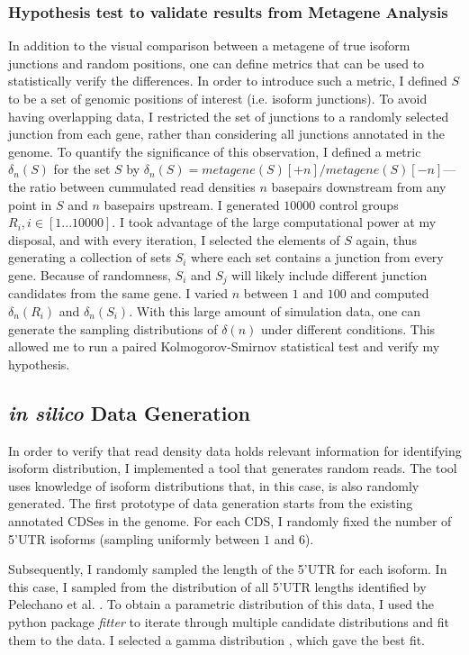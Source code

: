 \documentclass[12pt]{article}
\begin{document}
\subsubsection{Hypothesis test to validate results from Metagene Analysis} \label{ks_test}
In addition to the visual comparison between a metagene of true isoform junctions and random positions, one can define metrics that can be used to statistically verify the differences. In order to introduce such a metric, I defined $S$ to be a set of genomic positions of interest (i.e. isoform junctions). To avoid having overlapping data, I restricted the set of junctions to a randomly selected junction from each gene, rather than considering all junctions annotated in the genome.     
To quantify the significance of this observation, I defined a metric $\delta_n(S)$ for the set $S$ by $\delta_n(S) = metagene(S)[+n] / metagene(S)[-n]$---the ratio between cummulated read densities $n$ basepairs downstream from any point in $S$ and $n$ basepairs upstream. I generated $10000$ control groups $R_i, i \in [1...10000]$. I took advantage of the large computational power at my disposal, and with every iteration, I selected the elements of $S$ again, thus generating a collection of sets $S_i$ where each set contains a junction from every gene. Because of randomness, $S_i$ and $S_j$ will likely include different junction candidates from the same gene. I varied $n$ between $1$ and $100$ and computed $\delta_n(R_i)$ and $\delta_n(S_i)$. With this large amount of simulation data, one can generate the sampling distributions of $\delta(n)$ under different conditions. This allowed me to run a paired Kolmogorov-Smirnov \cite{Massey1951} statistical test and verify my hypothesis. 


\subsection{\textit{in silico} Data Generation}\label{generating}

In order to verify that read density data holds relevant information for identifying isoform distribution, I implemented a tool that generates random reads. The tool uses knowledge of isoform distributions that, in this case, is also randomly generated. The first prototype of data generation starts from the existing annotated CDSes in the genome. For each CDS, I randomly fixed the number of 5'UTR isoforms (sampling uniformly between $1$ and $6$). 

Subsequently, I randomly sampled the length of the 5'UTR for each isoform. In this case, I sampled from the distribution of all 5'UTR lengths identified by Pelechano et al. \cite{Pelechano2013}. To obtain a parametric distribution of this data, I used the python package \textit{fitter} to iterate through multiple candidate distributions and fit them to the data. I selected a gamma distribution \cite{gamma}, which gave the best fit. 
\end{document}
